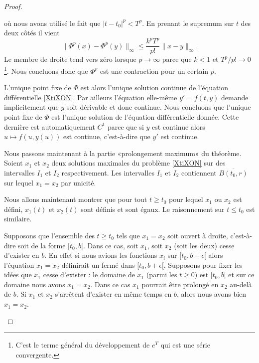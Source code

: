 \begin{proof}
\begin{subproof}
\begin{equation}
		\end{equation}
		où nous avons utilisé le fait que \( | t-t_0 |^p<T^p\). En prenant le supremum sur \( t\) des deux côtés il vient
		\begin{equation}
			\| \Phi^p(x)-\Phi^p(y) \|_{\infty}\leq\frac{ k^pT^p }{ p! }\| x-y \|_{\infty}.
		\end{equation}
		Le membre de droite tend vers zéro lorsque \( p\to\infty\) parce que \( k<1\) et \( T^p/p!\to 0\)\footnote{C'est le terme général du développement de \(  e^{T}\) qui est une série convergente.}. Nous concluons donc que \( \Phi^p\) est une contraction pour un certain \( p\).

		\spitem[Conclusion]

		L'unique point fixe de \( \Phi\) est alors l'unique solution continue de l'équation différentielle \eqref{XtiXON}. Par ailleurs l'équation elle-même \( y'=f(t,y)\) demande implicitement que \( y\) soit dérivable et donc continue. Nous concluons que l'unique point fixe de \( \Phi\) est l'unique solution de l'équation différentielle donnée. Cette dernière est automatiquement \( C^1\) parce que si \( y\) est continue alors \( u\mapsto f(u,y(u))\) est continue, c'est-à-dire que \( y'\) est continue.

		\spitem[Unicité]

		Nous passons maintenant à la partie «prolongement maximum» du théorème. Soient \( x_1\) et \( x_2\) deux solutions maximales du problème \eqref{XtiXON} sur des intervalles \( I_1\) et \( I_2\) respectivement. Les intervalles \( I_1\) et \( I_2\) contiennent \( \overline{ B(t_0,r) }\) sur lequel \( x_1=x_2\) par unicité.

		Nous allons maintenant montrer que pour tout \( t\geq t_0\) pour lequel \( x_1\) ou \( x_2\) est défini, \( x_1(t)\) et \( x_2(t)\) sont définis et sont égaux. Le raisonnement sur \( t\leq t_0\) est similaire.

		Supposons que l'ensemble des \( t\geq t_0\) tels que \( x_1=x_2\) soit ouvert à droite, c'est-à-dire soit de la forme \( \mathopen[ t_0 ,b [\). Dans ce cas, soit \( x_1\), soit \( x_2\) (soit les deux) cesse d'exister en \( b\). En effet si nous avions les fonctions \( x_i\) sur \(\mathopen[ t_0 , b+\epsilon [\) alors l'équation \( x_1=x_2\) définirait un fermé dans \( \mathopen[ t_0 , b+\epsilon [\). Supposons pour fixer les idées que \( x_1\) cesse d'exister : le domaine de \( x_1\) (parmi les \( t\geq 0\)) est \( \mathopen[ t_0 , b [\) et sur ce domaine nous avons \( x_1=x_2\). Dans ce cas \( x_1\) pourrait être prolongé en \( x_2\) au-delà de \( b\). Si \( x_1\) et \( x_2\) s'arrêtent d'exister en même temps en \( b\), alors nous avons bien \( x_1=x_2\).


\end{subproof}
\end{proof}
